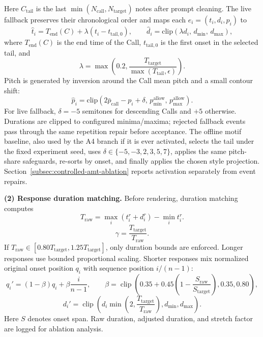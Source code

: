 \documentclass[11pt,a4paper]{article}
\begin{document}
Here $C_{\mathrm{tail}}$ is the last $\min(N_{\mathrm{call}},N_{\mathrm{target}})$ notes after prompt cleaning. The live fallback preserves their chronological order and maps each $e_i=(t_i,d_i,p_i)$ to
\begin{equation}
\hat{t}_i
=
T_{\mathrm{end}}(C)
+
\lambda
\left(
t_i - t_{\mathrm{tail},0}
\right),
\qquad
\hat{d}_i
=
\mathrm{clip}
\left(
\lambda d_i,\,
d_{\min},\,
d_{\max}
\right),
\label{eq:fallback-time-rule}
\end{equation}
where $T_{\mathrm{end}}(C)$ is the end time of the Call, $t_{\mathrm{tail},0}$ is the first onset in the selected tail, and
\begin{equation}
\lambda =
\max\left(0.2,\frac{T_{\mathrm{target}}}
{\max(T_{\mathrm{tail}}, \epsilon)}\right).
\label{eq:fallback-scale}
\end{equation}
Pitch is generated by inversion around the Call mean pitch and a small contour shift:
\begin{equation}
\hat{p}_i
=
\mathrm{clip}
\left(
2\bar{p}_{\mathrm{call}} - p_i + \delta,\,
p_{\min}^{\mathrm{allow}},\,
p_{\max}^{\mathrm{allow}}
\right).
\label{eq:fallback-pitch-rule}
\end{equation}
For live fallback, $\delta=-5$ semitones for descending Calls and $+5$ otherwise. Durations are clipped to configured minima/maxima; rejected fallback events pass through the same repetition repair before acceptance. The offline motif baseline, also used by the A4 branch if it is ever activated, selects the tail under the fixed experiment seed, uses $\delta\in\{-5,-3,2,3,5,7\}$, applies the same pitch-share safeguards, re-sorts by onset, and finally applies the chosen style projection. Section~\ref{subsec:controlled-amt-ablation} reports activation separately from event repairs.

\noindent\textbf{(2) Response duration matching.}
Before rendering, duration matching computes
\begin{equation}
T_{\mathrm{raw}} = \max_i(t_i^r+d_i^r)-\min_i t_i^r.
\label{eq:raw-response-duration}
\end{equation}
\begin{equation}
\gamma =
\frac{T_{\mathrm{target}}}{T_{\mathrm{raw}}}.
\label{eq:duration-match-ratio}
\end{equation}
If $T_{\mathrm{raw}}\in[0.80T_{\mathrm{target}},1.25T_{\mathrm{target}}]$, only duration bounds are enforced. Longer responses use bounded proportional scaling. Shorter responses mix normalized original onset position $q_i$ with sequence position $i/(n-1)$:
\begin{equation}
q_i'=(1-\beta)q_i+\beta\frac{i}{n-1},
\qquad
\beta=\operatorname{clip}\left(0.35+0.45\left(1-\frac{S_{\mathrm{raw}}}{S_{\mathrm{target}}}\right),0.35,0.80\right),
\label{eq:actual-onset-time}
\end{equation}
\begin{equation}
d_i'=\operatorname{clip}\left(d_i\min\left(2,\frac{T_{\mathrm{target}}}{T_{\mathrm{raw}}}\right),d_{\min},d_{\max}\right).
\label{eq:actual-duration}
\end{equation}
Here $S$ denotes onset span. Raw duration, adjusted duration, and stretch factor are logged for ablation analysis.
\end{document}
